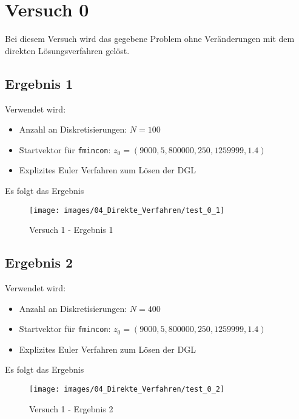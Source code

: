 \newpage
\section{Versuch 0}\label{kap:Versuch0}
Bei diesem Versuch wird das gegebene Problem ohne Veränderungen mit dem direkten Lösungsverfahren gelöst.

\subsection{Ergebnis 1}\label{kap:Versuch0Ergebnis1}
Verwendet wird:
\begin{itemize}
\item Anzahl an Diskretisierungen: $N = 100$ 
\item Startvektor für \texttt{fmincon}: $z_0 = (9000,5,800000,250,1259999,1.4)$
\item Explizites Euler Verfahren zum Lösen der DGL
\end{itemize}
Es folgt das Ergebnis
\begin{figure}[H]
\begin{center}
\texttt{[image: images/04\_Direkte\_Verfahren/test\_0\_1]}
\caption{Versuch 1 - Ergebnis 1}\label{img:test_0_1}
\end{center}
\end{figure}

\newpage
\subsection{Ergebnis 2}\label{kap:Versuch0Ergebnis2}
Verwendet wird:
\begin{itemize}
\item Anzahl an Diskretisierungen: $N = 400$ 
\item Startvektor für \texttt{fmincon}: $z_0 = (9000,5,800000,250,1259999,1.4)$
\item Explizites Euler Verfahren zum Lösen der DGL
\end{itemize}
Es folgt das Ergebnis
\begin{figure}[H]
\begin{center}
\texttt{[image: images/04\_Direkte\_Verfahren/test\_0\_2]}
\caption{Versuch 1 - Ergebnis 2}\label{img:test_0_2}
\end{center}
\end{figure}














